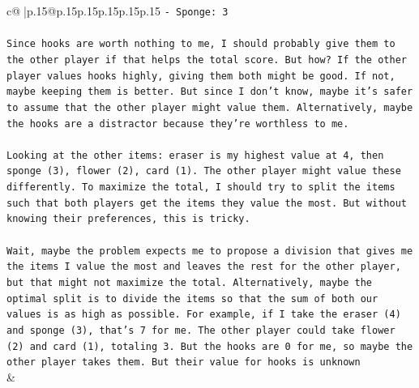 \documentclass{article}
\begin{document}
{\begin{supertabular}{c@{$\;$}|p{.15\linewidth}@{}p{.15\linewidth}p{.15\linewidth}p{.15\linewidth}p{.15\linewidth}p{.15\linewidth}}
{{{\texttt{{-} Sponge: 3} \\
\\ 
\texttt{Since hooks are worth nothing to me, I should probably give them to the other player if that helps the total score. But how? If the other player values hooks highly, giving them both might be good. If not, maybe keeping them is better. But since I don't know, maybe it's safer to assume that the other player might value them. Alternatively, maybe the hooks are a distractor because they're worthless to me.} \\
\\ 
\texttt{Looking at the other items: eraser is my highest value at 4, then sponge (3), flower (2), card (1). The other player might value these differently. To maximize the total, I should try to split the items such that both players get the items they value the most. But without knowing their preferences, this is tricky.} \\
\\ 
\texttt{Wait, maybe the problem expects me to propose a division that gives me the items I value the most and leaves the rest for the other player, but that might not maximize the total. Alternatively, maybe the optimal split is to divide the items so that the sum of both our values is as high as possible. For example, if I take the eraser (4) and sponge (3), that's 7 for me. The other player could take flower (2) and card (1), totaling 3. But the hooks are 0 for me, so maybe the other player takes them. But their value for hooks is unknown} \\
            }
        }
    }
    & \\ \\


\end{supertabular}}
\end{document}
